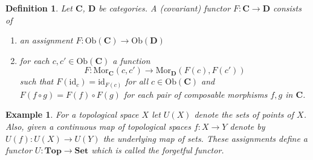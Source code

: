 \documentclass[11pt, letterpaper, oneside]{report}
\theoremstyle{pplain}
\theoremstyle{ddefinition}
\newtheorem{definition}[theorem]{Definition}
\newtheorem{example}[theorem]{Example}
\theoremstyle{nnn}
\theoremstyle{eexercise}
\newcommand{\Mor}{\mathrm{Mor}}
\newcommand{\id}{\mathrm{id}}
\newcommand{\CC}{{\mathbf C}}
\newcommand{\DD}{{\mathbf D}}
\newcommand{\Top}{{\mathbf{Top}}}
\newcommand{\Set}{{\mathbf{Set}}}
\newcommand{\benu}{\begin{enumerate}}
\newcommand{\eenu}{\end{enumerate}}
\begin{document}
\begin{definition}
Let $\CC$, $\DD$ be  categories. A \emph{(covariant) functor} $F\colon  \CC \to \DD$ consists of 
\benu
\item[1)] an assignment $F\colon \text{Ob}(\CC) \to \text{Ob}(\DD)$
\item[2)] for each $c, c'\in \text{Ob}(\CC)$ a function 
$$F\colon \Mor_{\CC}(c, c') \to \Mor_{\DD}(F(c), F(c'))$$
such that $F(\id_{c}) = \id_{F(c)}$ for all $c\in \text{Ob}(\CC)$ and $F(f\circ g) = F(f)\circ F(g)$ for each 
pair of composable morphisms $f, g$ in $\CC$. 
\eenu
\end{definition}

\begin{example}
For a topological space $X$ let $U(X)$ denote the sets of points of $X$. Also, given a continuous 
map of topological spaces $f\colon X \to Y$ denote by $U(f)\colon U(X)\to U(Y)$ the underlying map 
of sets. These assignments define a functor $U\colon \Top \to \Set$ which is called 
the \emph{forgetful functor}. 
\end{example}
\end{document}

